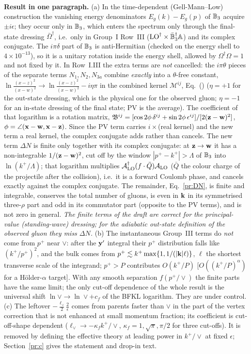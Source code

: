 \noindent\textbf{Result in one paragraph.}
(a) In the time-dependent (Gell-Mann--Low) construction the vanishing energy denominators $E_g(k)-E_g(p)$ of $\mathbb{B}_3$ acquire
$\pm i\epsilon$; they occur only in $\mathbb{B}_3$, which enters the spectrum only through the final-state dressing $\bar\Omega^\dagger$, i.e.\ only in Group~I Row~III ($\mathrm{LO}^\dagger\times\bar{\mathbb{B}}_3^\dagger\mathbb{A}$) and its complex conjugate. The $i\pi\delta$ part of $\mathbb{B}_3$ is anti-Hermitian (checked on the energy shell to $4\times10^{-13}$), so it is a unitary rotation inside the energy shell, allowed by $\Omega^\dagger\Omega=1$ and not fixed by it. In Row~I.III the extra terms are \emph{not} cancelled: the $i\pi\theta$ pieces of the separate terms $N_1,N_2,N_{3a}$ combine \emph{exactly} into a $\theta$-free constant, $\ln\frac{(x-z)^2}{(x-w)^2}\to\ln\frac{(x-z)^2}{(x-w)^2}-i\eta\pi$ in the combined kernel $\mathcal M^{ij}$, Eq.~() ($\eta=+1$ for the out-state dressing, which is the physical one for the observed gluon; $\eta=-1$ for an in-state dressing of the final state; PV is the average). The coefficient of that logarithm is a rotation matrix, $\mathfrak B^{ij}=[\cos2\phi\,\delta^{ij}+\sin2\phi\,\epsilon^{ij}]/[2(\mathbf{z}-\mathbf{w})^2]$, $\phi=\angle(\mathbf{x}-\mathbf{w},\mathbf{x}-\mathbf{z})$. Since the PV term carries $i\times$(real kernel) and the new term a real kernel, the complex conjugate adds rather than cancels. The new term $\Delta N$ is finite only together with its complex conjugate: at $\mathbf{z}\to\mathbf{w}$ it has a non-integrable $1/(\mathbf{z}-\mathbf{w})^2$, cut off by the window $|p^+-k^+|>\Lambda$ of $\mathbb{B}_3$ into $\ln(k^+/\Lambda)$; that logarithm multiplies $\mathcal A_{\rm LO}^\dagger(f\cdot\bar Q)\mathcal A_{\rm LO}$ ($\bar Q$ the colour charge of the projectile after the collision), i.e.\ it is a forward Coulomb phase, and cancels exactly against the complex conjugate. The remainder, Eq.~\eqref{pr:DN}, is finite and integrable, conserves the total number of gluons, is even in $\mathbf{k}$ in its symmetrised three-$\rho$ part and odd in its commutator part (opposite to the PV terms), and is not zero in general. \emph{The finite terms of the draft are correct for the principal-value (standing-wave) dressing; for the adiabatic out-state definition of the observed gluon they miss $\Delta N$.} (b) The instantaneous Group~III terms do \emph{not} come from $p^+$ near $\vee$: after the $\mathbf{y}'$ integral their $p^+$ distribution falls like $(k^+/p^+)^2$, and the bulk comes from $p^+\lesssim k^+\max\{1,1/(|\mathbf{k}|\ell)\}$, $\ell$ the shortest transverse scale of the integrand; $p^+>P$ contributes $O(k^+/P)$ [$O((k^+/P)^\alpha)$ for a H\"older-$\alpha$ target]. With any smooth separation $f(p^+/\vee)$ the finite parts have the same limit; the only cut-off dependence of the whole result is the universal shift $\ln\vee\to\ln\vee+c_f$ of the BFKL logarithm. They are under control. (c) The leftover $-\frac{\ell_\vee}{2}\frac2\epsilon$ comes from parents faster than $\vee$ in the part of the vertex correction that is not enhanced at small momentum fraction; its coefficient is cut-off-shape dependent ($\ell_\vee\to-\kappa_f k^+/\vee$, $\kappa_f=1,\sqrt\pi,\pi/2$ for three cut-offs). It is removed by defining the effective theory at leading power in $k^+/\vee$ at fixed $\epsilon$; Section~\ref{pr:c} gives the statement and drop-in text.

